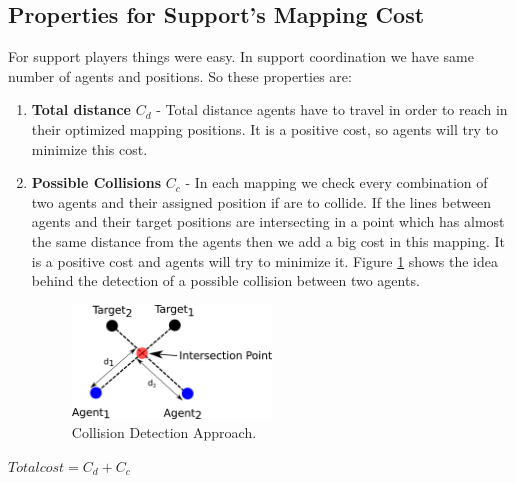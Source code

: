 \subsection{Properties for Support's Mapping Cost}
For support players things were easy. In support coordination we have same number of agents and positions. So these properties are:  
\begin{enumerate}
\item \textbf{Total distance }$C_{d}$ - Total distance agents have to travel in order to reach in their optimized mapping positions. It is a positive cost, so agents will try to minimize this cost.
\item \textbf{Possible Collisions }$C_{c}$ - In each mapping we check every combination of two agents and their assigned position if are to collide. If the lines between agents and their target positions are intersecting in a point which has almost the same distance from the agents then we add a big cost in this mapping. It is a positive cost and agents will try to minimize it. Figure \ref{fig:AvoidCollision} shows the idea behind the detection of a possible collision between two agents.
\begin{figure}[htb!]
\centering
  \includegraphics[width=0.5\textwidth]{Chapter4/figures/AvoidCollision.pdf}
  \caption{Collision Detection Approach.} 
  \label{fig:AvoidCollision}
\end{figure}
\end{enumerate}
\begin{center}
$Total cost = C_{d}+C_{c}$
\end{center}


